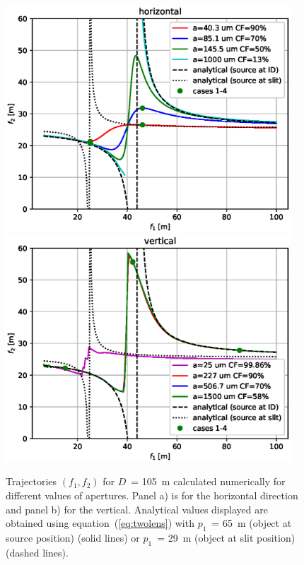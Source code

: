 \documentclass{iucr}              %
\begin{document}
\begin{figure}\label{fig:f1f2map}
    \centering

    \includegraphics[width=0.95\textwidth]{figures/f1f2_h.eps}
    \includegraphics[width=0.95\textwidth]{figures/f1f2_v.eps}

    \caption{Trajectories $(f_1,f_2)$ for $D$~= \SI{105}{\meter} calculated numerically for different values of apertures. Panel a) is for the horizontal direction and panel b) for the vertical. 
    Analytical values displayed are obtained using equation~(\ref{eq:twolens}) with $p_1$~= \SI{65}{\meter} (object at source position) (solid lines) or $p_1$~= \SI{29}{\meter} (object at slit position) (dashed lines).
    }
\end{figure}
\end{document}
